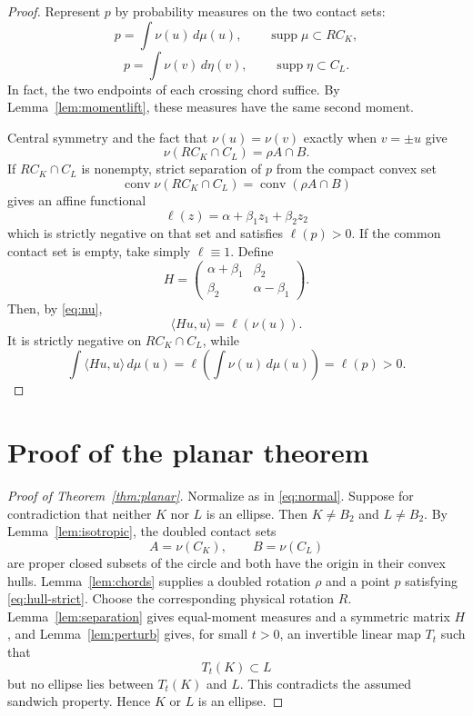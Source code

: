 \documentclass[11pt]{amsart}
\theoremstyle{definition}
\theoremstyle{remark}
\newcommand{\B}{B_2}
\newcommand{\conv}{\operatorname{conv}}
\newcommand{\supp}{\operatorname{supp}}
\newcommand{\ip}[2]{\langle #1,#2\rangle}
\begin{document}
\begin{proof}
Represent $p$ by probability measures on the two contact sets:
\[
 p=\int\nu(u)\,d\mu(u),\qquad \supp\mu\subset R C_K,
\]
\[
 p=\int\nu(v)\,d\eta(v),\qquad \supp\eta\subset C_L.
\]
In fact, the two endpoints of each crossing chord suffice.  By
Lemma~\ref{lem:momentlift}, these measures have the same second moment.

Central symmetry and the fact that $\nu(u)=\nu(v)$ exactly when
$v=\pm u$ give
\[
 \nu(R C_K\cap C_L)=\rho A\cap B.
\]
If $R C_K\cap C_L$ is nonempty, strict separation of $p$ from the compact
convex set
\[
 \conv\nu(R C_K\cap C_L)
 =\conv(\rho A\cap B)
\]
gives an affine functional
\[
 \ell(z)=\alpha+\beta_1z_1+\beta_2z_2
\]
which is strictly negative on that set and satisfies $\ell(p)>0$.  If the
common contact set is empty, take simply $\ell\equiv1$.  Define
\[
 H=\begin{pmatrix}
  \alpha+\beta_1&\beta_2\\
  \beta_2&\alpha-\beta_1
 \end{pmatrix}.
\]
Then, by \eqref{eq:nu},
\[
 \ip{Hu}{u}=\ell(\nu(u)).
\]
It is strictly negative on $R C_K\cap C_L$, while
\[
 \int\ip{Hu}{u}\,d\mu(u)
 =\ell\!\left(\int\nu(u)\,d\mu(u)\right)
 =\ell(p)>0.
\]
\end{proof}

\section{Proof of the planar theorem}\label{sec:planarproof}

\begin{proof}[Proof of Theorem~\ref{thm:planar}]
Normalize as in \eqref{eq:normal}.  Suppose for contradiction that neither
$K$ nor $L$ is an ellipse.  Then $K\ne\B$ and $L\ne\B$.  By
Lemma~\ref{lem:isotropic}, the doubled contact sets
\[
 A=\nu(C_K),\qquad B=\nu(C_L)
\]
are proper closed subsets of the circle and both have the origin in their
convex hulls.  Lemma~\ref{lem:chords} supplies a doubled rotation $\rho$ and a
point $p$ satisfying \eqref{eq:hull-strict}.  Choose the corresponding
physical rotation $R$.  Lemma~\ref{lem:separation} gives equal-moment measures
and a symmetric matrix $H$, and Lemma~\ref{lem:perturb} gives, for small
$t>0$, an invertible linear map $T_t$ such that
\[
 T_t(K)\subset L
\]
but no ellipse lies between $T_t(K)$ and $L$.  This contradicts the assumed
sandwich property.  Hence $K$ or $L$ is an ellipse.
\end{proof}
\end{document}
